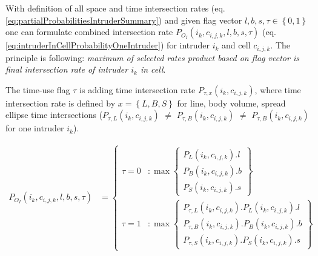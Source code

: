 \noindent With definition of all space and time intersection rates (eq. \ref{eq:partialProbabilitiesIntruderSummary}) and given flag vector $l,b,s,\tau \in\left\{0,1\right\}$ one can formulate combined intersection rate $P_{O_I}(i_k,c_{i,j,k},l,b,s,\tau)$ (eq. \ref{eq:intruderInCellProbabilityOneIntruder}) for intruder $i_k$ and cell $c_{i,j,k}$. The principle is following: \emph{maximum of selected rates product based on flag vector is final intersection rate of intruder $i_k$ in cell}. 

The time-use flag $\tau$ is adding time intersection rate $P_{\tau,x}(i_k,c_{i,j,k})$, where time intersection rate is defined by $x=\left\{L,B,S\right\}$ for line, body volume, spread ellipse time intersections ($P_{\tau,L}(i_k,c_{i,j,k})$ $\neq$ $P_{\tau,B}(i_k,c_{i,j,k})$ $\neq$ $P_{\tau,B}(i_k,c_{i,j,k})$ for one intruder $i_k$).

\begin{equation}\label{eq:intruderInCellProbabilityOneIntruder}
    \begin{aligned}
        P_{O_I}(i_k,c_{i,j,k},l,b,s,\tau) & = \begin{cases}\tau=0&:\max\left\{\begin{aligned}P_L(i_k,c_{i,j,k}).l\\ P_B(i_k,c_{i,j,k}).b\\P_S(i_k,c_{i,j,k}).s\end{aligned}\right\}\\\tau=1&:\max\left\{\begin{aligned}P_{\tau,L}(i_k,c_{i,j,k}).P_L(i_k,c_{i,j,k}).l\\ P_{\tau,B}(i_k,c_{i,j,k}).P_B(i_k,c_{i,j,k}).b\\P_{\tau,S}(i_k,c_{i,j,k}).P_S(i_k,c_{i,j,k}).s\end{aligned}\right\}\end{cases} &\\
    \end{aligned}
\end{equation}
